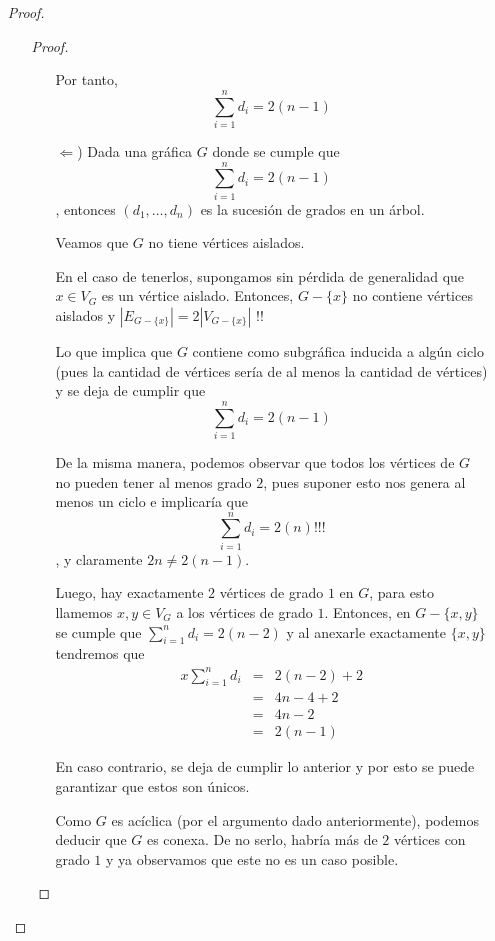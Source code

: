 \documentclass{article}
\begin{document}
\begin{enumerate}
\begin{proof}
\begin{enumerate}
\begin{proof}
\begin{itemize}
            Por tanto,
            \[
            \sum_{i=1}^n d_i = 2(n - 1)
            \]

          \item[$\Leftarrow$)] Dada una gr\'afica $G$ donde se cumple que
            $$\displaystyle \sum_{i=1}^n d_i = 2(n-1)$$
            , entonces $(d_1, \dots, d_n)$ es la sucesi\'on de grados en un \'arbol.

            Veamos que $G$ no tiene v\'ertices aislados.

            En el caso de tenerlos, supongamos sin p\'erdida de generalidad que
            $x \in V_G$ es un v\'ertice aislado. Entonces, $G - \{x\}$ no contiene
            v\'ertices aislados
            y $|E_{G - \{x\}}| = 2|V_{G - \{x\}}|$ !!

            Lo que implica que $G$ contiene como subgr\'afica inducida a alg\'un
            ciclo (pues la cantidad de v\'ertices ser\'ia de al menos la cantidad
            de v\'ertices) y se deja de cumplir que
            $$\displaystyle \sum_{i=1}^n d_i = 2(n-1)$$

            De la misma manera, podemos observar que todos los v\'ertices
            de $G$ no pueden tener al menos grado $2$, pues suponer esto nos genera
            al menos un ciclo e implicar\'ia que
            $$\displaystyle \sum_{i=1}^n d_i = 2(n) \text{!!!}$$
            , y claramente $2n \not= 2(n - 1)$.

            Luego, hay exactamente $2$ v\'ertices de grado $1$ en $G$, para esto
            llamemos $x, y \in V_G$ a los v\'ertices de grado $1$. Entonces, en
            $G -\{x, y\}$ se cumple que $\displaystyle \sum_{i=1}^n d_i = 2(n-2)$
            y al anexarle exactamente $\{x, y\}$ tendremos que
            \begin{eqnarray*}x
              \sum_{i=1}^n d_i &=& 2(n-2) + 2\\
              &=& 4n - 4 + 2\\
              &=& 4n - 2\\
              &=& 2(n - 1)
            \end{eqnarray*}

            En caso contrario, se deja de cumplir lo anterior y por esto
            se puede garantizar que estos son \'unicos.

            Como $G$ es ac\'iclica (por el argumento dado anteriormente), podemos
            deducir que $G$ es conexa. De no serlo, habr\'ia m\'as de $2$
            v\'ertices con grado $1$ y ya observamos que este no es un caso posible.


\end{itemize}
\end{proof}
\end{enumerate}
\end{proof}
\end{enumerate}
\end{document}
